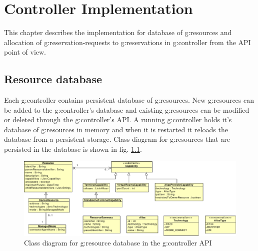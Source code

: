 \chapter{Controller Implementation}



This chapter describes the implementation for database of \glspl{g:resource} and allocation of \glspl{g:reservation-request} to \glspl{g:reservation} in \gls{g:controller} from the API point of view.

\section{Resource database}

Each \gls{g:controller} contains persistent database of \glspl{g:resource}. New \glspl{g:resource} can be added to the \gls{g:controller}'s database and existing \glspl{g:resource} can be modified or deleted through the \gls{g:controller}'s API. A running \gls{g:controller} holds it's database of \glspl{g:resource} in memory and when it is restarted it reloads the database from a persistent storage. Class diagram for \glspl{g:resource} that are persisted in the database is shown in fig. \ref{fig:cd_api_resources}.

\begin{figure}[ht!]
\includegraphics[width=\textwidth]{diagrams/cd_api_resources}
\caption{Class diagram for \gls{g:resource} database in the \gls{g:controller} API}
\label{fig:cd_api_resources}
\end{figure}

